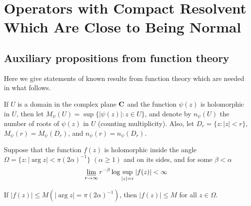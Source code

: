 \chapter[Operators with Compact Resolvent]%
{Operators with Compact Resolvent\\
Which Are Close to Being Normal}

\section{Auxiliary propositions from function theory}
Here we give statements of known results from function theory
which are needed in what follows.

If $U$ is a domain in the complex plane $\bold C$ and the function
$\psi(z)$ is holomorphic in $U$, then let $M_\psi(U)=\sup\{|\psi
(z)|\colon z\in U\}$, and denote by $n_\psi(U)$ the number of roots of $\psi(z)$
in $U$ (counting multiplicity). Also, let $D_r=\{z\colon |z|<r\}$, $M_\psi(r)=M
_\psi(D_r)$, and $n_\psi(r)=n_\psi(D_r)$.
\begin{lem} Suppose that the
 function
$f(z)$ is holomorphic inside the angle $\Omega=\{z\colon | \arg
z|<\pi(2\alpha)^{-1}\}$
$(\alpha\geq1)$ and on its sides, and for some
$\beta<\alpha$ 
\begin{equation}
\varliminf_{r\to\infty}r^{-\beta}\log\sup_{|z|=r}|f(z)|<\infty
\end{equation}

If $|f(z)|\leq M(|\arg z|=\pi(2\alpha)^{-1})$, then
$|f(z)|\leq M$ for all $z\in\Omega$.
\end{lem}

\endinput
